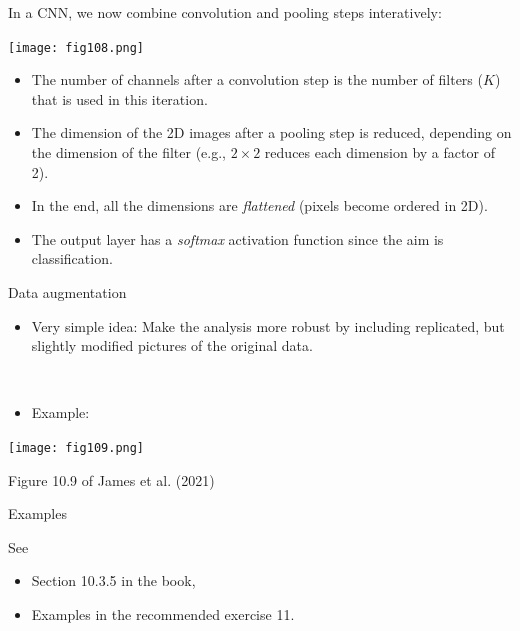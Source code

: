 \documentclass[
  10pt,
  ignorenonframetext,
]{beamer}
\providecommand{\tightlist}{%
  \setlength{\itemsep}{0pt}\setlength{\parskip}{0pt}}
\begin{document}
\begin{frame}
In a CNN, we now combine convolution and pooling steps interatively:

\centering

\texttt{[image: fig108.png]}

\begin{itemize}
\item
  The number of channels after a convolution step is the number of
  filters (\(K\)) that is used in this iteration.
\item
  The dimension of the 2D images after a pooling step is reduced,
  depending on the dimension of the filter (e.g., \(2\times 2\) reduces
  each dimension by a factor of 2).
\item
  In the end, all the dimensions are \emph{flattened} (pixels become
  ordered in 2D).
\item
  The output layer has a \emph{softmax} activation function since the
  aim is classification.
\end{itemize}
\end{frame}

\begin{frame}
\begin{block}{Data augmentation}
\protect\hypertarget{data-augmentation}{}
\(~\)

\begin{itemize}
\tightlist
\item
  Very simple idea: Make the analysis more robust by including
  replicated, but slightly modified pictures of the original data.
\end{itemize}

\(~\)

\begin{itemize}
\tightlist
\item
  Example:
\end{itemize}

\texttt{[image: fig109.png]}

\scriptsize Figure 10.9 of James et al. (2021)
\end{block}
\end{frame}

\begin{frame}
\begin{block}{Examples}
\protect\hypertarget{examples}{}
\(~\)

See

\begin{itemize}
\item
  Section 10.3.5 in the book,
\item
  Examples in the recommended exercise 11.
\end{itemize}
\end{block}
\end{frame}
\end{document}
